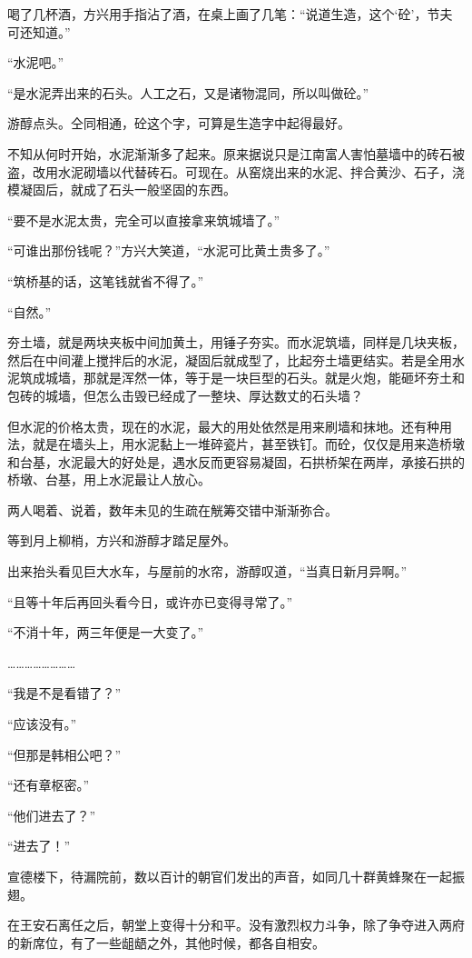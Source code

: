 喝了几杯酒，方兴用手指沾了酒，在桌上画了几笔：“说道生造，这个‘砼’，节夫可还知道。”

“水泥吧。”

“是水泥弄出来的石头。人工之石，又是诸物混同，所以叫做砼。”

游醇点头。仝同相通，砼这个字，可算是生造字中起得最好。

不知从何时开始，水泥渐渐多了起来。原来据说只是江南富人害怕墓墙中的砖石被盗，改用水泥砌墙以代替砖石。可现在。从窑烧出来的水泥、拌合黄沙、石子，浇模凝固后，就成了石头一般坚固的东西。

“要不是水泥太贵，完全可以直接拿来筑城墙了。”

“可谁出那份钱呢？”方兴大笑道，“水泥可比黄土贵多了。”

“筑桥基的话，这笔钱就省不得了。”

“自然。”

夯土墙，就是两块夹板中间加黄土，用锤子夯实。而水泥筑墙，同样是几块夹板，然后在中间灌上搅拌后的水泥，凝固后就成型了，比起夯土墙更结实。若是全用水泥筑成城墙，那就是浑然一体，等于是一块巨型的石头。就是火炮，能砸坏夯土和包砖的城墙，但怎么击毁已经成了一整块、厚达数丈的石头墙？

但水泥的价格太贵，现在的水泥，最大的用处依然是用来刷墙和抹地。还有种用法，就是在墙头上，用水泥黏上一堆碎瓷片，甚至铁钉。而砼，仅仅是用来造桥墩和台基，水泥最大的好处是，遇水反而更容易凝固，石拱桥架在两岸，承接石拱的桥墩、台基，用上水泥最让人放心。

两人喝着、说着，数年未见的生疏在觥筹交错中渐渐弥合。

等到月上柳梢，方兴和游醇才踏足屋外。

出来抬头看见巨大水车，与屋前的水帘，游醇叹道，“当真日新月异啊。”

“且等十年后再回头看今日，或许亦已变得寻常了。”

“不消十年，两三年便是一大变了。”

……………………

“我是不是看错了？”

“应该没有。”

“但那是韩相公吧？”

“还有章枢密。”

“他们进去了？”

“进去了！”

宣德楼下，待漏院前，数以百计的朝官们发出的声音，如同几十群黄蜂聚在一起振翅。

在王安石离任之后，朝堂上变得十分和平。没有激烈权力斗争，除了争夺进入两府的新席位，有了一些龃龉之外，其他时候，都各自相安。

